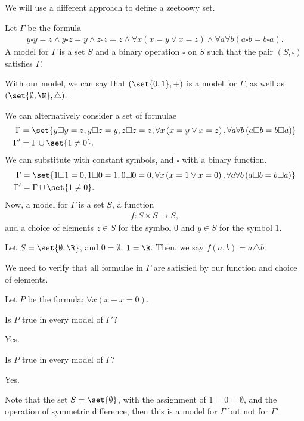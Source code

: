 \documentclass[10pt]{mypackage}
\begin{document}
We will use a different approach to define a zeetoowy set.
\begin{definition}
  Let $\Gamma$ be the formula
  \begin{align*}
    y\square y = z \wedge y\square z = y \wedge z\square z = z \wedge \forall x \left(x=y\vee x=z\right) \wedge \forall a \forall b \left(a\square b = b\square a\right).
  \end{align*}
  A model for $\Gamma$ is a set $S$ and a binary operation $\square$ on $S$ such that the pair $\left(S,\square\right)$ satisfies $\Gamma$.
\end{definition}
With our model, we can say that $\left(\set{0,1},+\right)$ is a model for $\Gamma$, as well as $\left(\set{\emptyset,\N},\triangle\right)$.\newline

We can alternatively consider a set of formulae
\begin{align*}
  \Gamma &= \set{y\square y = z, y\square z = y, z\square z = z, \forall x\left(x=y\vee x=z\right),\forall a \forall b \left(a\square b = b\square a\right)}\\
  \Gamma' &= \Gamma \cup \set{1\neq 0}.
\end{align*}
We can substitute with constant symbols, and $\square $ with a binary function.
\begin{align*}
  \Gamma &= \set{1\square 1 = 0, 1\square 0 = 1, 0\square 0 = 0, \forall x\left(x=1\vee x=0\right),\forall a \forall b \left(a\square b = b\square a\right)}\\
  \Gamma' &= \Gamma \cup \set{1\neq 0}.
\end{align*}
Now, a model for $\Gamma$ is a set $S$, a function
\begin{align*}
  f: S\times S \rightarrow S,
\end{align*}
and a choice of elements $z\in S$ for the symbol $0$ and $y\in S$ for the symbol $1$.
\begin{example}
  Let $S = \set{\emptyset,\R}$, and $0 = \emptyset$, $1 = \R$. Then, we say $f\left(a,b\right) = a\triangle b$.\newline

  We need to verify that all formulae in $\Gamma$ are satisfied by our function and choice of elements.
\end{example}
\begin{example}
  Let $P$ be the formula: $\forall x \left(x + x = 0\right)$. 
  \begin{question}
    Is $P$ true in every model of $\Gamma'$?
  \end{question}
  \begin{answer}
    Yes.
  \end{answer}
  \begin{question}
    Is $P$ true in every model of $\Gamma$?
  \end{question}
  \begin{answer}
    Yes.
  \end{answer}
  Note that the set $S = \set{\emptyset}$, with the assignment of $1 = 0 = \emptyset$, and the operation of symmetric difference, then this is a model for $\Gamma$ but not for $\Gamma'$
\end{example}
\end{document}
